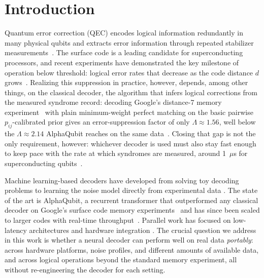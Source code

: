 \documentclass[aps,prxquantum,twocolumn,superscriptaddress,nofootinbib]{revtex4-2}
\begin{document}
\maketitle

\section{Introduction}
\label{sec:intro}



Quantum error correction (QEC) encodes logical information redundantly in many physical qubits and extracts error information through repeated stabilizer measurements~\cite{dennis2002topological,fowler2012surface, gottesman1997stabilizercodesquantumerror}. The surface code is a leading candidate for superconducting processors, and recent experiments have demonstrated the key milestone of operation below threshold: logical error rates that decrease as the code distance $d$ grows~\cite{google2024threshold}. Realizing this suppression in practice, however, depends, among other things, on the classical decoder, the algorithm that infers logical corrections from the measured syndrome record: decoding Google's distance-7 memory experiment~\cite{google2024threshold} with plain minimum-weight perfect matching on the basic pairwise $p_{ij}$-calibrated prior gives an error-suppression factor of only $\Lambda \approx 1.56$, well below the $\Lambda \approx 2.14$ AlphaQubit reaches on the same data~\cite{google2024threshold, bausch2024alphaqubit}. Closing that gap is not the only requirement, however: whichever decoder is used must also stay fast enough to keep pace with the rate at which syndromes are measured, around 1~$\mu$s for superconducting qubits~\cite{Terhal_2015, google2024threshold}.

Machine learning-based decoders have developed from solving toy decoding problems \cite{torlai2017neural,meinerz2022scalable,gu2026scalable, Chamberland_2018, Baireuther_2019, Krastanov_2017, wang2023transformerqecquantumerrorcorrection, Andreasson_2019, Fitzek_2020, Sweke_2020} to learning the noise model directly from experimental data \cite{Varbanov_2025,lange2025gnn, zhang2026parallel}. The state of the art is AlphaQubit, a recurrent transformer that outperformed any classical decoder on Google's surface code memory experiments~\cite{bausch2024alphaqubit} and has since been scaled to larger codes with real-time throughput~\cite{senior2025alphaqubit2}. Parallel work has focused on low-latency architectures and hardware integration \cite{Overwater_2022, chamberland2023techniques,gicev2023scalable,zhang2026parallel,yon2025memristive,cicero2026lowlatencygnnaccelerator,yang2026realtime}. The crucial question we address in this work is whether a neural decoder can perform well on real data \emph{portably}: across hardware platforms, noise profiles, and different amounts of available data, and across logical operations beyond the standard memory experiment, all without re-engineering the decoder for each setting.
\end{document}
